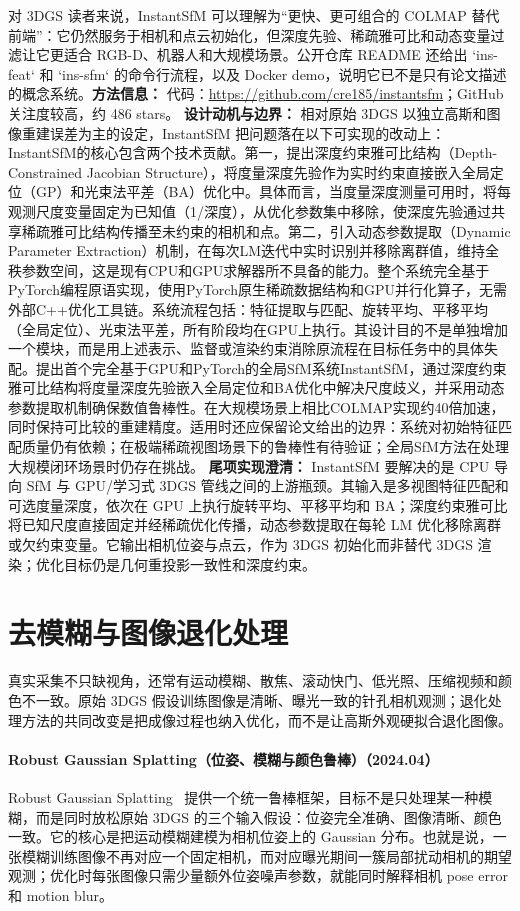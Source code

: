对 3DGS 读者来说，InstantSfM 可以理解为“更快、更可组合的 COLMAP 替代前端”：它仍然服务于相机和点云初始化，但深度先验、稀疏雅可比和动态变量过滤让它更适合 RGB-D、机器人和大规模场景。公开仓库 README 还给出 `ins-feat` 和 `ins-sfm` 的命令行流程，以及 Docker demo，说明它已不是只有论文描述的概念系统。\textbf{方法信息：} 代码：\url{https://github.com/cre185/instantsfm}；GitHub 关注度较高，约 486 stars。
\textbf{设计动机与边界：} 相对原始 3DGS 以独立高斯和图像重建误差为主的设定，InstantSfM 把问题落在以下可实现的改动上：InstantSfM的核心包含两个技术贡献。第一，提出深度约束雅可比结构（Depth-Constrained Jacobian Structure），将度量深度先验作为实时约束直接嵌入全局定位（GP）和光束法平差（BA）优化中。具体而言，当度量深度测量可用时，将每观测尺度变量固定为已知值（1/深度），从优化参数集中移除，使深度先验通过共享稀疏雅可比结构传播至未约束的相机和点。第二，引入动态参数提取（Dynamic Parameter Extraction）机制，在每次LM迭代中实时识别并移除离群值，维持全秩参数空间，这是现有CPU和GPU求解器所不具备的能力。整个系统完全基于PyTorch编程原语实现，使用PyTorch原生稀疏数据结构和GPU并行化算子，无需外部C++优化工具链。系统流程包括：特征提取与匹配、旋转平均、平移平均（全局定位）、光束法平差，所有阶段均在GPU上执行。其设计目的不是单独增加一个模块，而是用上述表示、监督或渲染约束消除原流程在目标任务中的具体失配。提出首个完全基于GPU和PyTorch的全局SfM系统InstantSfM，通过深度约束雅可比结构将度量深度先验嵌入全局定位和BA优化中解决尺度歧义，并采用动态参数提取机制确保数值鲁棒性。在大规模场景上相比COLMAP实现约40倍加速，同时保持可比较的重建精度。适用时还应保留论文给出的边界：系统对初始特征匹配质量仍有依赖；在极端稀疏视图场景下的鲁棒性有待验证；全局SfM方法在处理大规模闭环场景时仍存在挑战。
\textbf{尾项实现澄清：} InstantSfM 要解决的是 CPU 导向 SfM 与 GPU/学习式 3DGS 管线之间的上游瓶颈。其输入是多视图特征匹配和可选度量深度，依次在 GPU 上执行旋转平均、平移平均和 BA；深度约束雅可比将已知尺度直接固定并经稀疏优化传播，动态参数提取在每轮 LM 优化移除离群或欠约束变量。它输出相机位姿与点云，作为 3DGS 初始化而非替代 3DGS 渲染；优化目标仍是几何重投影一致性和深度约束。

\section{去模糊与图像退化处理}

真实采集不只缺视角，还常有运动模糊、散焦、滚动快门、低光照、压缩视频和颜色不一致。原始 3DGS 假设训练图像是清晰、曝光一致的针孔相机观测；退化处理方法的共同改变是把成像过程也纳入优化，而不是让高斯外观硬拟合退化图像。
\paragraph{Robust Gaussian Splatting（位姿、模糊与颜色鲁棒）（2024.04）}
Robust Gaussian Splatting~\cite{2404_04211} 提供一个统一鲁棒框架，目标不是只处理某一种模糊，而是同时放松原始 3DGS 的三个输入假设：位姿完全准确、图像清晰、颜色一致。它的核心是把运动模糊建模为相机位姿上的 Gaussian 分布。也就是说，一张模糊训练图像不再对应一个固定相机，而对应曝光期间一簇局部扰动相机的期望观测；优化时每张图像只需少量额外位姿噪声参数，就能同时解释相机 pose error 和 motion blur。

